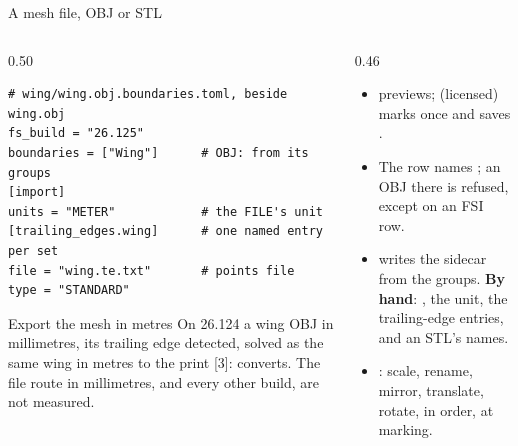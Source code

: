 \begin{frame}[fragile]{A mesh file, OBJ or STL}
\begin{columns}[T]
\begin{column}{0.50\textwidth}
\begin{lstlisting}[style=ftsbase]
# wing/wing.obj.boundaries.toml, beside wing.obj
fs_build = "26.125"
boundaries = ["Wing"]      # OBJ: from its groups
[import]
units = "METER"            # the FILE's unit
[trailing_edges.wing]      # one named entry per set
file = "wing.te.txt"       # points file
type = "STANDARD"
\end{lstlisting}
\begin{alertblock}{Export the mesh in metres}
\small On 26.124 a wing OBJ in millimetres, its trailing edge detected,
solved as the same wing in metres to the print [3]: 
converts. The file route in millimetres, and every other build, are not
measured.
\end{alertblock}
\end{column}
\begin{column}{0.46\textwidth}
\begin{itemize}\small
  \item {} previews;
         (licensed) marks once and saves .
  \item The row names ; an OBJ there is refused,
        except on an FSI row.
  \item {} writes the sidecar from the groups.
        \textbf{By hand}: , the unit, the trailing-edge
        entries, and an STL's names.
  \item {}: scale, rename, mirror, translate,
        rotate, in order, at marking.
\end{itemize}
\end{column}
\end{columns}
\end{frame}

